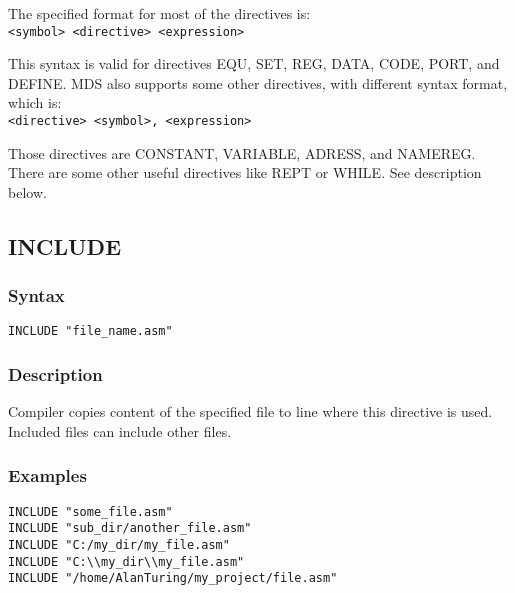     The specified format for most of the directives is:\\
    {
        \usecodefont
        \verb'<symbol> <directive> <expression>'
    }

    \bigskip

    This syntax is valid for directives EQU, SET, REG, DATA, CODE, PORT, and DEFINE. MDS also supports some other directives, with different syntax format, which is:\\
    {
        \usecodefont
        \verb'<directive> <symbol>, <expression>'
    }

    \bigskip

    Those directives are CONSTANT, VARIABLE, ADRESS, and NAMEREG. There are some other useful directives like REPT or WHILE. See description below.

    \clearpage
    \subsection{INCLUDE}
        \subsubsection{Syntax}
            {
                \usecodefont
                \verb'INCLUDE "file_name.asm"'
            }

        \subsubsection{Description}
            Compiler copies content of the specified file to line where this directive is used. Included files can include other files.

        \subsubsection{Examples}
            {
                \usecodefont
                \verb'INCLUDE "some_file.asm"'\\
                \verb'INCLUDE "sub_dir/another_file.asm"'\\
                \verb'INCLUDE "C:/my_dir/my_file.asm"'\\
                \verb'INCLUDE "C:\\my_dir\\my_file.asm"'\\
                \verb'INCLUDE "/home/AlanTuring/my_project/file.asm"'\\
            }

